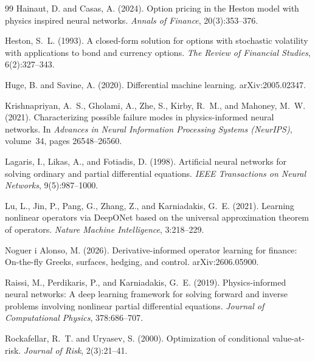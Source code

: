 \documentclass{article}
\begin{document}
\begin{thebibliography}{99}
Hainaut, D. and Casas, A. (2024).
\newblock Option pricing in the Heston model with physics inspired neural networks.
\newblock \emph{Annals of Finance}, 20(3):353--376.

Heston, S.~L. (1993).
\newblock A closed-form solution for options with stochastic volatility with
applications to bond and currency options.
\newblock \emph{The Review of Financial Studies}, 6(2):327--343.

Huge, B. and Savine, A. (2020).
\newblock Differential machine learning.
\newblock arXiv:2005.02347.

Krishnapriyan, A.~S., Gholami, A., Zhe, S., Kirby, R.~M., and Mahoney, M.~W. (2021).
\newblock Characterizing possible failure modes in physics-informed neural networks.
\newblock In \emph{Advances in Neural Information Processing Systems (NeurIPS)},
volume~34, pages 26548--26560.

Lagaris, I., Likas, A., and Fotiadis, D. (1998).
\newblock Artificial neural networks for solving ordinary and partial
differential equations.
\newblock \emph{IEEE Transactions on Neural Networks}, 9(5):987--1000.

Lu, L., Jin, P., Pang, G., Zhang, Z., and Karniadakis, G.~E. (2021).
\newblock Learning nonlinear operators via DeepONet based on the universal
approximation theorem of operators.
\newblock \emph{Nature Machine Intelligence}, 3:218--229.

Noguer i Alonso, M. (2026).
\newblock Derivative-informed operator learning for finance: On-the-fly Greeks,
surfaces, hedging, and control.
\newblock arXiv:2606.05900.

Raissi, M., Perdikaris, P., and Karniadakis, G.~E. (2019).
\newblock Physics-informed neural networks: A deep learning framework for solving
forward and inverse problems involving nonlinear partial differential equations.
\newblock \emph{Journal of Computational Physics}, 378:686--707.

Rockafellar, R.~T. and Uryasev, S. (2000).
\newblock Optimization of conditional value-at-risk.
\newblock \emph{Journal of Risk}, 2(3):21--41.


\end{thebibliography}
\end{document}
